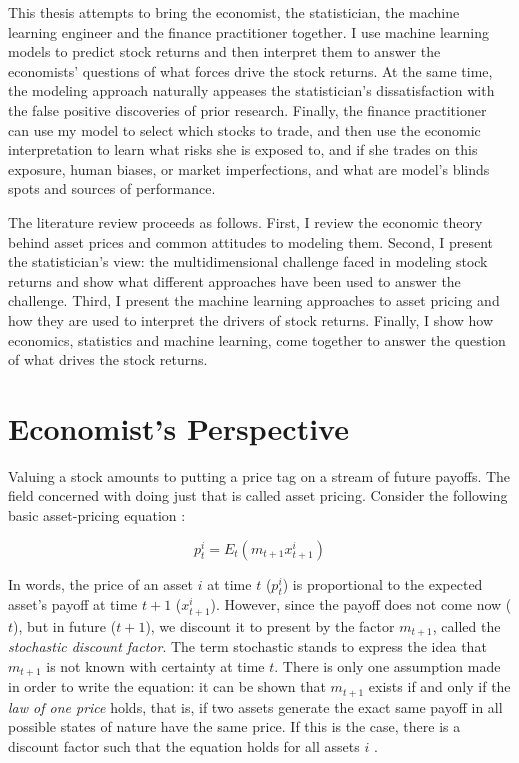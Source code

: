 	This thesis attempts to bring the economist, the statistician, the machine learning engineer and the finance practitioner together. I use machine learning models to predict stock returns and then interpret them to answer the economists' questions of what forces drive the stock returns. At the same time, the modeling approach naturally appeases the statistician's dissatisfaction with the false positive discoveries of prior research. Finally, the finance practitioner can use my model to select which stocks to trade, and then use the economic interpretation to learn what risks she is exposed to, and if she trades on this exposure, human biases, or market imperfections, and what are model's blinds spots and sources of performance. 
 	
 	The literature review proceeds as follows. First, I review the economic theory behind asset prices and common attitudes to modeling them. Second, I present the statistician's view: the multidimensional challenge faced in modeling stock returns \citep{cochrane2011presidential} and show what different approaches have been used to answer the challenge. Third, I present the machine learning approaches to asset pricing and how they are used to interpret the drivers of stock returns. Finally, I show how economics, statistics and machine learning, come together to answer the question of what drives the stock returns. 
 	
 	\section{Economist's Perspective}
 	
	 	Valuing a stock amounts to putting a price tag on a stream of future payoffs. The field concerned with doing just that is called asset pricing. Consider the following basic asset-pricing equation \citep{cochrane2009asset}:
	 	
	 	\begin{equation}
	 		p_t^i = E_t(m_{t+1} x_{t+1}^i ) \label{eq:pEmx}
	 	\end{equation}
	 	
	 	In words, the price of an asset $i$ at time $t$ ($p_t^i$) is proportional to the expected asset's payoff at time $t+1$ ($x_{t+1}^i$). However, since the payoff does not come now ($t$), but in future ($t+1$), we discount it to present by the factor $m_{t+1}$, called the \textit{stochastic discount factor}. The term stochastic stands to express the idea that $m_{t+1}$ is not known with certainty at time $t$. There is only one assumption made in order to write the equation: it can be shown that $m_{t+1}$ exists if and only if the \textit{law of one price} holds, that is, if two assets generate the exact same payoff in all possible states of nature have the same price. If this is the case, there is a discount factor such that the equation holds for all assets $i$ \citep{cochrane2009asset}.
	 	
